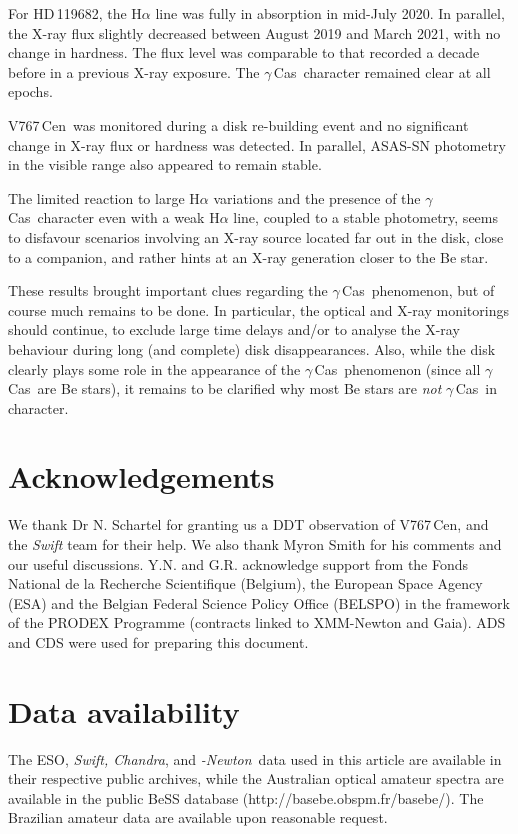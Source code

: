 \documentclass[a4paper,fleqn,usenatbib]{mnras}
\newcommand{\xmm}{{\sc{XMM}}\emph{-Newton}}
\newcommand{\gc}{$\gamma$\,Cas}
\newcommand{\hd}{HD\,119682}
\newcommand{\vc}{V767\,Cen}
\begin{document}
For \hd, the H$\alpha$ line was fully in absorption in mid-July 2020. In parallel, the X-ray flux slightly decreased between August 2019 and March 2021, with no change in hardness. The flux level was comparable to that recorded a decade before in a previous X-ray exposure. The \gc\ character remained clear at all epochs.

\vc\ was monitored during a disk re-building event and no significant change in X-ray flux or hardness was detected. In parallel, ASAS-SN photometry in the visible range also appeared to remain stable.

The limited reaction to large H$\alpha$ variations and the presence of the \gc\ character even with a weak H$\alpha$ line, coupled to a stable photometry, seems to disfavour scenarios involving an X-ray source located far out in the disk, close to a companion, and rather hints at an X-ray generation closer to the Be star. 
        

These results brought important clues regarding the \gc\ phenomenon, but of course much remains to be done. In particular, the optical and X-ray monitorings should continue, to exclude large time delays and/or to analyse the X-ray behaviour during long (and complete) disk disappearances. Also, while the disk clearly plays some role in the appearance of the \gc\ phenomenon (since all \gc\ are Be stars), it remains to be clarified why most Be stars are {\it not} \gc\ in character. 

\section*{Acknowledgements}
We thank Dr N. Schartel for granting us a DDT observation of \vc, and the {\it Swift} team for their help. We also thank Myron Smith for his comments and our useful discussions. Y.N. and G.R. acknowledge support from the Fonds National de la Recherche Scientifique (Belgium), the European Space Agency (ESA) and the Belgian Federal Science Policy Office (BELSPO) in the framework of the PRODEX Programme (contracts linked to XMM-Newton and Gaia). ADS and CDS were used for preparing this document. 

\section*{Data availability}
The ESO, {\it Swift, Chandra}, and \xmm\ data used in this article are available in their respective public archives, while the Australian optical amateur spectra are available in the public BeSS database (http://basebe.obspm.fr/basebe/). The Brazilian amateur data are available upon reasonable request.
\end{document}
